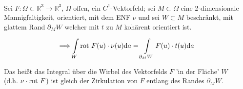 \begin{satz}
\mbox{}\\
Sei $F: \Omega \subset \mathbb{R}^3 \rightarrow \mathbb{R}^3 $,
$\Omega$ offen, ein $C^1$-Vektorfeld;
sei $M \subset \Omega $ eine 2-dimensionale Mannigfaltigkeit, orientiert,
mit dem ENF $\nu$ und sei $W \subset M $ beschränkt,
mit glattem Rand $\partial_M W $ welcher mit $t$ zu $M$ kohärent orientiert ist.

\begin{equation}
    \Longrightarrow
    \int\limits_W \mathrm{rot\ } F(u) \cdot \nu(u) \mathrm{d}a
    =
    \int\limits_{\partial_M W} F(u) \cdot t(u) \mathrm{d}a
\end{equation}

\end{satz}

Das heißt das Integral über die Wirbel des Vektorfelds $F$ 'in der Fläche' $W$\\
(d.h.  $\nu \cdot \mathrm{rot\ } F $)
ist gleich der Zirkulation von $F$ entlang des Randes $\partial_M W $.

